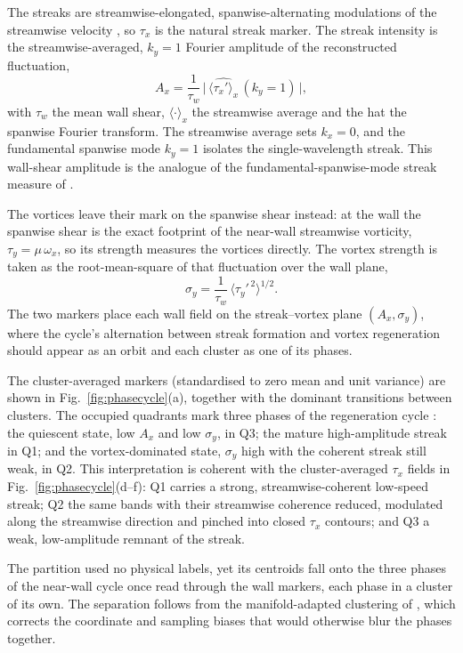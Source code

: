 \documentclass[pdflatex,sn-basic]{sn-jnl}
\theoremstyle{thmstyleone}%
\theoremstyle{thmstyletwo}%
\theoremstyle{thmstylethree}%
\begin{document}
The streaks are streamwise-elongated, spanwise-alternating modulations of the
streamwise velocity \citep{robinson1991coherent}, so $\tau_x$ is the natural streak marker.
The streak intensity is the streamwise-averaged, $k_y=1$ Fourier amplitude of the reconstructed
fluctuation,
\begin{equation}
	A_x = \frac{1}{\tau_w}\,
	\big|\,\widehat{\langle\tau_x'\rangle_x}\,(k_y{=}1)\,\big|,
	\label{eq:streak}
\end{equation}
with $\tau_w$ the mean wall shear, $\langle\cdot\rangle_x$ the streamwise average
and the hat the spanwise Fourier transform. The streamwise average sets
$k_x{=}0$, and the fundamental spanwise mode $k_y{=}1$ isolates the
single-wavelength streak. This wall-shear amplitude is the analogue
of the fundamental-spanwise-mode streak measure of \citet{Hamilton_Kim_Waleffe_1995}.

The vortices leave their mark on the
spanwise shear instead: at the wall the spanwise shear is the exact footprint of
the near-wall streamwise vorticity, $\tau_y = \mu\,\omega_x$, so its strength
measures the vortices directly.
The vortex strength is taken as the root-mean-square of that fluctuation over the wall plane,
\begin{equation}
	\sigma_y = \frac{1}{\tau_w}\,
	\big\langle \tau_y'^{\,2} \big\rangle^{1/2}.
	\label{eq:qsv}
\end{equation}
The two markers place each wall field on the streak--vortex plane
$(A_x,\sigma_y)$, where the cycle's alternation between streak formation and
vortex regeneration should appear as an orbit and each cluster as one of its
phases.

The cluster-averaged markers (standardised to zero mean and unit variance) are shown in
Fig.~\ref{fig:phasecycle}(a),
together with the dominant transitions between clusters.
The occupied quadrants mark three phases of the regeneration
cycle \citep{Hamilton_Kim_Waleffe_1995,Waleffe_1997}:
the quiescent state, low $A_x$ and low $\sigma_y$, in Q3;
the mature high-amplitude streak in Q1;
and the vortex-dominated state, $\sigma_y$ high with the coherent streak still weak, in Q2.
This interpretation is coherent with the cluster-averaged $\tau_x$ fields
in Fig.~\ref{fig:phasecycle}(d--f):
Q1 carries a strong, streamwise-coherent low-speed streak;
Q2 the same bands with their streamwise coherence reduced, modulated along the
streamwise direction and pinched into closed $\tau_x$ contours;
and Q3 a weak, low-amplitude remnant of the streak.

The partition used no physical labels, yet its centroids fall onto the three phases of the
near-wall cycle once read through the wall markers, each phase in a cluster of its own. The
separation follows from the manifold-adapted clustering of \citet{perezcuadrado2026manifold},
which corrects the coordinate and sampling biases that would otherwise blur the phases together.
\end{document}
